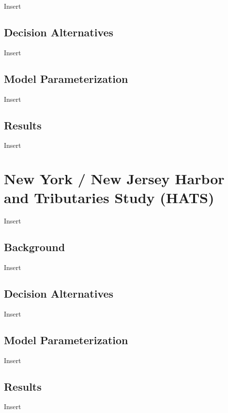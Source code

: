 \documentclass[
]{book}
\begin{document}
Insert

\hypertarget{decision-alternatives}{%
\section{Decision Alternatives}\label{decision-alternatives}}

Insert

\hypertarget{model-parameterization}{%
\section{Model Parameterization}\label{model-parameterization}}

Insert

\hypertarget{results}{%
\section{Results}\label{results}}

Insert

\hypertarget{new-york-new-jersey-harbor-and-tributaries-study-hats}{%
\chapter{New York / New Jersey Harbor and Tributaries Study (HATS)}\label{new-york-new-jersey-harbor-and-tributaries-study-hats}}

Insert

\hypertarget{background-2}{%
\section{Background}\label{background-2}}

Insert

\hypertarget{decision-alternatives-1}{%
\section{Decision Alternatives}\label{decision-alternatives-1}}

Insert

\hypertarget{model-parameterization-1}{%
\section{Model Parameterization}\label{model-parameterization-1}}

Insert

\hypertarget{results-1}{%
\section{Results}\label{results-1}}

Insert

  
\end{document}
